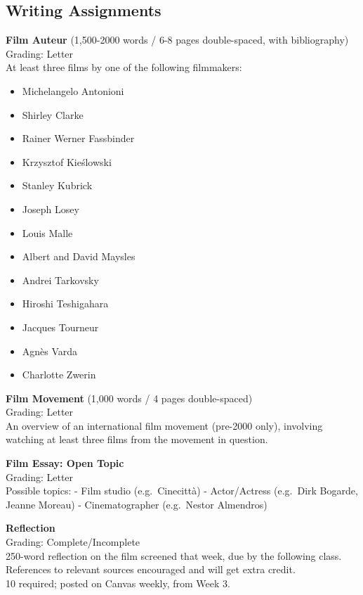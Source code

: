 \documentclass[
  letterpaper,
  DIV=11,
  numbers=noendperiod,
  oneside]{scrartcl}
\providecommand{\tightlist}{%
  \setlength{\itemsep}{0pt}\setlength{\parskip}{0pt}}
\begin{document}
\subsection{Writing Assignments}\label{writing-assignments}

\textbf{Film Auteur} (1,500-2000 words / 6-8 pages double-spaced, with
bibliography)\\
Grading: Letter\\
At least three films by one of the following filmmakers:

\begin{itemize}
\tightlist
\item
  Michelangelo Antonioni
\item
  Shirley Clarke
\item
  Rainer Werner Fassbinder
\item
  Krzysztof Kieślowski
\item
  Stanley Kubrick
\item
  Joseph Losey
\item
  Louis Malle
\item
  Albert and David Maysles
\item
  Andrei Tarkovsky
\item
  Hiroshi Teshigahara
\item
  Jacques Tourneur
\item
  Agnès Varda
\item
  Charlotte Zwerin
\end{itemize}

\textbf{Film Movement} (1,000 words / 4 pages double-spaced)\\
Grading: Letter\\
An overview of an international film movement (pre-2000 only), involving
watching at least three films from the movement in question.

\textbf{Film Essay: Open Topic}\\
Grading: Letter\\
Possible topics: - Film studio (e.g.~Cinecittà) - Actor/Actress
(e.g.~Dirk Bogarde, Jeanne Moreau) - Cinematographer (e.g.~Nestor
Almendros)

\textbf{Reflection}\\
Grading: Complete/Incomplete\\
250-word reflection on the film screened that week, due by the following
class.\\
References to relevant sources encouraged and will get extra credit.\\
10 required; posted on Canvas weekly, from Week 3.
\end{document}
